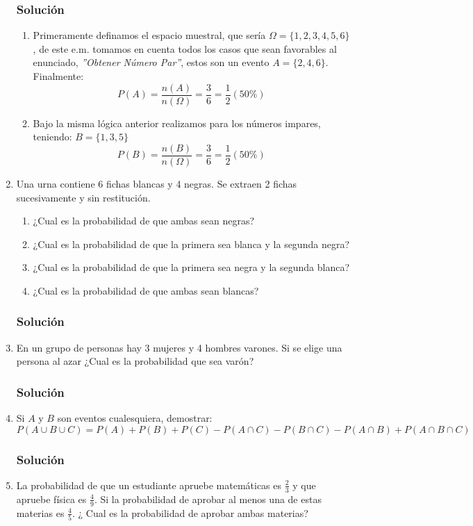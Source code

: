 \begin{enumerate}
\begin{enumerate}
\end{enumerate}
\subsubsection{Solución}
\begin{enumerate}
\item Primeramente definamos el espacio muestral, que sería $\Omega = \lbrace 1,2,3,4,5,6 \rbrace$, de este e.m. tomamos en cuenta todos los casos que sean favorables al enunciado, \textit{''Obtener Número Par''}, estos son un evento $A=\lbrace 2,4,6\rbrace$. Finalmente:
$$P(A)=\dfrac{n(A)}{n(\Omega)}=\dfrac{3}{6}=\dfrac{1}{2} (50\%)$$
\item Bajo la misma lógica anterior realizamos para los números impares, teniendo: $B=\lbrace 1,3,5\rbrace$
$$P(B)=\dfrac{n(B)}{n(\Omega)}=\dfrac{3}{6}=\dfrac{1}{2} (50\%)$$
\end{enumerate}
\item Una urna contiene 6 fichas blancas y 4 negras. Se extraen 2 fichas sucesivamente y sin restitución.
\begin{enumerate}
\item ¿Cual es la probabilidad de que ambas sean negras?
\item ¿Cual es la probabilidad de que la primera sea blanca y la segunda negra?
\item ¿Cual es la probabilidad de que la primera sea negra y la segunda blanca?
\item ¿Cual es la probabilidad de que ambas sean blancas?
\end{enumerate}
\subsubsection{Solución}
\item En un grupo de personas hay 3 mujeres y 4 hombres varones. Si se elige una persona al azar ¿Cual es la probabilidad que sea varón?
\subsubsection{Solución}
\item Si $A$ y  $B$ son eventos cualesquiera, demostrar:
$$P(A\cup B\cup C)=P(A)+P(B)+P(C)-P(A\cap C)-P(B\cap C)-P(A\cap B)+P(A\cap B \cap C)$$
\subsubsection{Solución}
\item La probabilidad de que un estudiante apruebe matemáticas es $\frac{2}{3}$ y que apruebe física es $\frac{4}{9}$. Si la probabilidad de aprobar al menos una de estas materias es $\frac{4}{5}$. ¿ Cual es la probabilidad de aprobar ambas materias?

\end{enumerate}
